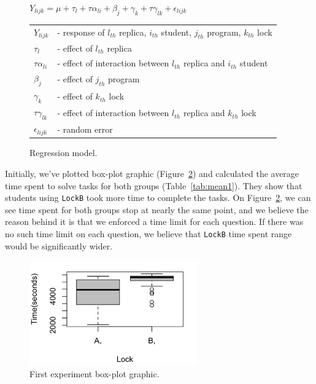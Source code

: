\begin{figure}
\begin{center}
$Y_{lijk} = \mu + \tau_{l} + \tau\alpha_{li} + \beta_{j} + \gamma_{k} + \tau\gamma_{lk} + \epsilon_{lijk}$\\
\vspace{4mm}
\begin{tabular}{ll}
$Y_{lijk}$ & - response of $l_{th}$ replica, $i_{th}$ student, $j_{th}$ program, $k_{th}$ lock \\
$\tau_{l}$ & - effect of $l_{th}$ replica \\
$\tau\alpha_{li}$ & - effect of interaction between $l_{th}$ replica and $i_{th}$ student \\
$\beta_{j}$ & - effect of $j_{th}$ program \\
$\gamma_{k}$ & - effect of $k_{th}$ lock \\
$\tau\gamma_{lk}$ & - effect of interaction between $l_{th}$ replica and $k_{th}$ lock \\
$\epsilon_{lijk}$ & - random error \\
\end{tabular}
\caption{Regression model.}\label{fig:model}
\end{center}
\end{figure}

Initially, we've plotted box-plot graphic (Figure~\ref{fig:boxplot1}) and calculated the average time spent to solve tasks for both groups (Table~\ref{tab:mean1}).
They show that students using {\tt LockB} took more time to complete the tasks.
On Figure~\ref{fig:boxplot1}, we can see time spent for both groups stop at nearly the same point, and we believe the reason behind it is that we enforced a time limit for each question.
If there was no such time limit on each question, we believe that {\tt LockB} time spent range would be significantly wider.

\begin{figure}
\centering
\includegraphics[height=4.5cm]{img/u1.png}
\caption{First experiment box-plot graphic.}\label{fig:boxplot1}
\end{figure}

